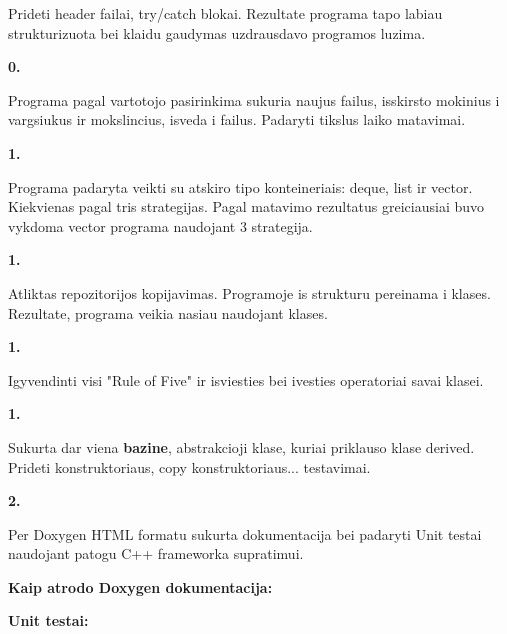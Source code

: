 Prideti header failai, try/catch blokai. Rezultate programa tapo labiau strukturizuota bei klaidu gaudymas uzdrausdavo programos luzima.

{\bfseries{0.}}

Programa pagal vartotojo pasirinkima sukuria naujus failus, isskirsto mokinius i vargsiukus ir mokslincius, isveda i failus. Padaryti tikslus laiko matavimai.

{\bfseries{1.}}

Programa padaryta veikti su atskiro tipo konteineriais\+: deque, list ir vector. Kiekvienas pagal tris strategijas. Pagal matavimo rezultatus greiciausiai buvo vykdoma vector programa naudojant 3 strategija.

{\bfseries{1.}}

Atliktas repozitorijos kopijavimas. Programoje is strukturu pereinama i klases. Rezultate, programa veikia nasiau naudojant klases.

{\bfseries{1.}}

Igyvendinti visi "{}\+Rule of Five"{} ir isviesties bei ivesties operatoriai savai klasei.

{\bfseries{1.}}

Sukurta dar viena {\bfseries{bazine}}, abstrakcioji klase, kuriai priklauso klase derived. Prideti konstruktoriaus, copy konstruktoriaus... testavimai.

{\bfseries{2.}}

Per Doxygen HTML formatu sukurta dokumentacija bei padaryti Unit testai naudojant patogu C++ framework\textquotesingle{}a supratimui.

{\bfseries{Kaip atrodo Doxygen dokumentacija\+:}}



{\bfseries{Unit testai\+:}}



 